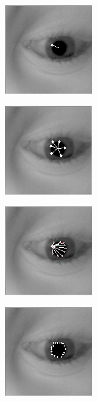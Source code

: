 \documentclass[rapport.tex]{subfiles}
\begin{document}
		
		
	\begin{figure}
	\centering
	\includegraphics[width=0.4\linewidth]{Billeder/Starburst, First single.png}
	\caption{}
	\label{fig:Starburst,Firstsingle}
	\end{figure}
		
		
	\begin{figure}
	\centering
	\includegraphics[width=0.4\linewidth]{Billeder/Starburst, First.png}
	\caption{}
	\label{fig:Starburst,First}
	\end{figure}
	
	
	\begin{figure}
	\centering
	\includegraphics[width=0.4\linewidth]{Billeder/Starburst, Second single.png}
	\caption{}
	\label{fig:Starburst,Secondsingle}
	\end{figure}
	
	
	\begin{figure}
	\centering
	\includegraphics[width=0.4\linewidth]{Billeder/Starburst, Second.png}
	\caption{}
	\label{fig:Starburst,Second}
	\end{figure}
		
\end{document}
